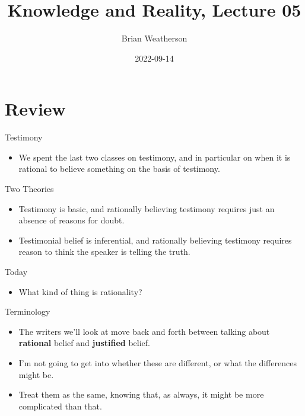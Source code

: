 \documentclass[
  17pt,
  letterpaper,
  ignorenonframetext,
  aspectratio=169,
  handout]{beamer}
\title{Knowledge and Reality, Lecture 05}
\author{Brian Weatherson}
\date{2022-09-14}
\providecommand{\tightlist}{%
  \setlength{\itemsep}{0pt}\setlength{\parskip}{0pt}}\usepackage{longtable,booktabs,array}
\begin{document}
\frame{\titlepage}
\ifdefined\Shaded\renewenvironment{Shaded}{\begin{tcolorbox}[frame hidden, borderline west={3pt}{0pt}{shadecolor}, sharp corners, breakable, enhanced, boxrule=0pt, interior hidden]}{\end{tcolorbox}}\fi

\hypertarget{review}{%
\section{Review}\label{review}}

\begin{frame}{Testimony}
\protect\hypertarget{testimony}{}
\begin{itemize}[<+->]
\tightlist
\item
  We spent the last two classes on testimony, and in particular on when
  it is rational to believe something on the basis of testimony.
\end{itemize}
\end{frame}

\begin{frame}{Two Theories}
\protect\hypertarget{two-theories}{}
\begin{itemize}[<+->]
\tightlist
\item
  Testimony is basic, and rationally believing testimony requires just
  an absence of reasons for doubt.
\item
  Testimonial belief is inferential, and rationally believing testimony
  requires reason to think the speaker is telling the truth.
\end{itemize}
\end{frame}

\begin{frame}{Today}
\protect\hypertarget{today}{}
\begin{itemize}[<+->]
\tightlist
\item
  What kind of thing is rationality?
\end{itemize}
\end{frame}

\begin{frame}{Terminology}
\protect\hypertarget{terminology}{}
\begin{itemize}[<+->]
\tightlist
\item
  The writers we'll look at move back and forth between talking about
  \textbf{rational} belief and \textbf{justified} belief.
\item
  I'm not going to get into whether these are different, or what the
  differences might be.
\item
  Treat them as the same, knowing that, as always, it might be more
  complicated than that.
\end{itemize}
\end{frame}
\end{document}
